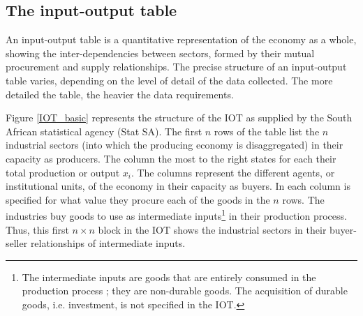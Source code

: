 \documentclass[12pt,english]{article}
\begin{document}
\subsection{The input-output table}\label{section_IOtable}

An input-output table is a quantitative representation of the economy as a whole, showing the inter-dependencies between sectors, formed by their mutual procurement and supply relationships. %
The precise structure of an input-output table varies, %
depending on the level of detail of the data collected. The more detailed the table, the heavier the data requirements. %

Figure \ref{IOT_basic} represents the structure of the IOT as supplied by the South African statistical agency (Stat SA). The first $n$ rows of the table list the $n$ industrial sectors (into which the producing economy is disaggregated) in their capacity as producers. The column the most to the right states for each their total production or output $x_i$. 
The columns represent the different agents, or institutional units, of the economy in their capacity as buyers. In each column is specified for what value they procure each of the goods in the $n$ rows. %
The industries buy goods to use as intermediate inputs\footnote{The intermediate inputs are goods that are entirely consumed in the production process ; they are non-durable goods. The acquisition of durable goods, i.e. investment, is not specified in the IOT.} in their production process. Thus, this first $n \times n$ block in the IOT shows the industrial sectors in their buyer-seller relationships of intermediate inputs. 
\end{document}
